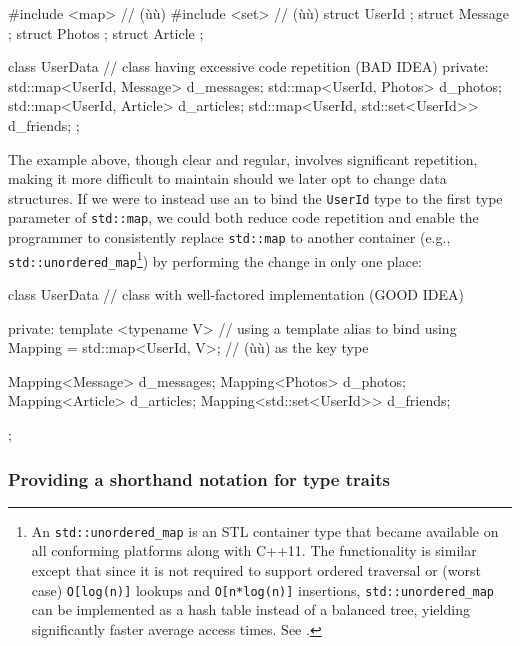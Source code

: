 \begin{emcppshiddenlisting}[emcppsbatch={e2,e3}]
#include <map>  // (ù{}ù)
#include <set>  // (ù{}ù)
struct UserId {};
struct Message {};
struct Photos {};
struct Article {};
\end{emcppshiddenlisting}
\begin{emcppslisting}[emcppsbatch=e2]
class UserData  // class having excessive code repetition (BAD IDEA)
{
private:
    std::map<UserId, Message>          d_messages;
    std::map<UserId, Photos>           d_photos;
    std::map<UserId, Article>          d_articles;
    std::map<UserId, std::set<UserId>> d_friends;
};
\end{emcppslisting}

\noindent The example above, though clear and regular, involves significant
repetition, making it more difficult to maintain should we later opt to
change data structures. If we were to instead use an  to bind the \lstinline!UserId! type to the first type
parameter of \lstinline!std::map!, we could both reduce code repetition
and enable the programmer to consistently replace \lstinline!std::map!
to another container
(e.g., \lstinline!std::unordered_map!{\cprotect\footnote{An
\lstinline!std::unordered_map! is an STL container type that became
available on all conforming platforms along with C++11. The
functionality is similar except that since it is not required to
support ordered traversal or (worst case) \lstinline!O[log(n)]! lookups
and \lstinline!O[n*log(n)]! insertions, \lstinline!std::unordered_map! can
be implemented as a hash table instead of a balanced tree, yielding
significantly faster average access times. See
  \cite{cpprefb}.}}) by performing the change in only
one place:

\newpage%
\begin{emcppslisting}[emcppsbatch=e3]
class UserData  // class with well-factored implementation (GOOD IDEA)
{
private:
    template <typename V>                  // using a template alias to bind
    using Mapping = std::map<UserId, V>;   // (ù{}ù) as the key type

    Mapping<Message>          d_messages;
    Mapping<Photos>           d_photos;
    Mapping<Article>          d_articles;
    Mapping<std::set<UserId>> d_friends;
};
\end{emcppslisting}


\subsubsection[Providing a shorthand notation for type traits]{Providing a shorthand notation for type traits}\label{providing-a-shorthand-notation-for-type-traits}


